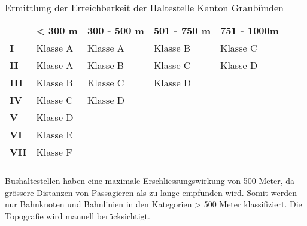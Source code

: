 \begin{longtable}[c]{l p{3.3cm} p{3.3cm} p{3.3cm} p{3.3cm}}
        \midrule
        \textbf{}
                                & \textbf{< 300 m}
                                & \textbf{300 - 500 m}
                                & \textbf{501 - 750 m}
                                & \textbf{751 - 1000m}\\
        \textbf{I}
                                & Klasse A
                                & Klasse A
                                & Klasse B
                                & Klasse C\\
        \textbf{II}
                                & Klasse A
                                & Klasse B
                                & Klasse C
                                & Klasse D\\
        \textbf{III}
                                & Klasse B
                                & Klasse C
                                & Klasse D
                                &\\
        \textbf{IV}
                                & Klasse C
                                & Klasse D
                                &
                                &\\
        \textbf{V}
                                & Klasse D
                                &
                                &
                                &\\
        \cellcolor{red!25}\textbf{VI}
                                & \cellcolor{red!25}Klasse E
                                &
                                &
                                &\\
        \cellcolor{red!25}\textbf{VII}
                                & \cellcolor{red!25}Klasse F
                                &
                                &
                                &\\                                
        \bottomrule
    \caption{Ermittlung der Erreichbarkeit der Haltestelle Kanton Graubünden}
    \label{table:Ermittlung Erreichbarkeit der Haltestelle Kanton Graubünden}
\end{longtable}

Bushaltestellen haben eine maximale Erschliessungswirkung von 500 Meter, da grössere Distanzen von Passagieren als zu lange empfunden wird.
Somit werden nur Bahnknoten und Bahnlinien in den Kategorien > 500 Meter klassifiziert.
Die Topografie wird manuell berücksichtigt.

